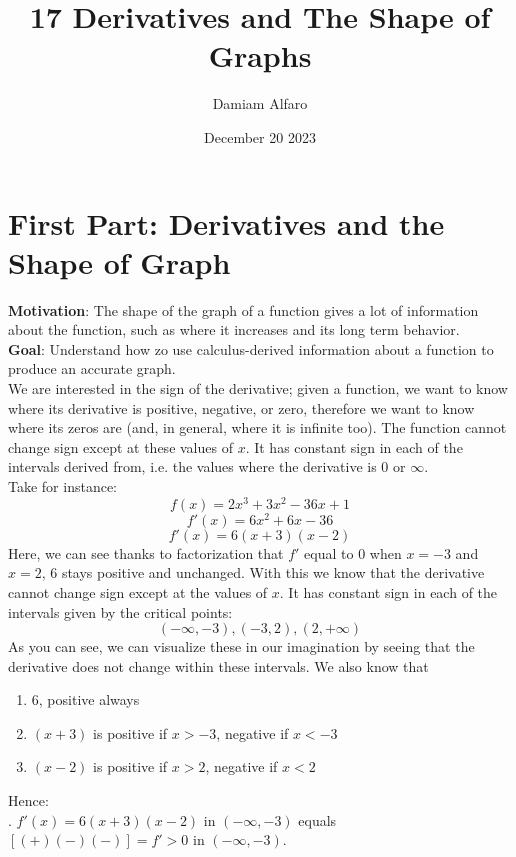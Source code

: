 \documentclass[12pt, letterpaper]{article}
\title{17 Derivatives and The Shape of Graphs}
\author{Damiam Alfaro}
\date{December 20 2023}
\begin{document}
\maketitle

\section{First Part: Derivatives and the Shape of Graph}
\textbf{Motivation}: The shape of the graph of a function gives a lot of information about the function, such as where it increases and its long term behavior.\\
\newline
\textbf{Goal}: Understand how zo use calculus-derived information about a function to produce an accurate graph.\\
\newline
We are interested in the sign of the derivative; given a function, we want to know where its derivative is positive, negative, or zero, therefore we want to know where its zeros are (and, in general, where it is infinite too). The function cannot change sign except at these values of \(x\). It has constant sign in each of the intervals derived from, i.e. the values where the derivative is \(0\) or \(\infty\).\\
\newline
Take for instance:
\[f(x)=2x^3+3x^2-36x+1\]
\[f'(x)=6x^2+6x-36\]
\[f'(x)=6(x+3)(x-2)\]
Here, we can see thanks to factorization that \(f'\) equal to \(0\) when \(x=-3\) and \(x=2\), \(6\) stays positive and unchanged. With this we know that the derivative cannot change sign except at the values of \(x\). It has constant sign in each of the intervals given by the critical points:
\[(-\infty,-3), (-3,2), (2,+\infty)\]
As you can see, we can visualize these in our imagination by seeing that the derivative does not change within these intervals. We also know that
\begin{enumerate}
    \item \(6\), positive always
    \item \((x+3)\) is positive if \(x > -3\), negative if \(x < -3\)
    \item \((x-2)\) is positive if \(x > 2\), negative if \(x < 2\)
\end{enumerate}
Hence:\\
. \(f'(x)=6(x+3)(x-2)\) in \((-\infty,-3)\) equals \([(+)(-)(-)] = f' > 0\) in \((-\infty,-3)\).\\
\newline
\end{document}

